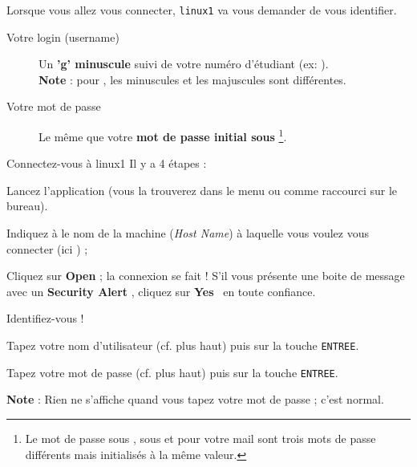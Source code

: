 \documentclass[a4paper,11pt]{style-esi/td}
\begin{document}
		\bigskip
		Lorsque vous allez vous connecter, \verb_linux1_ va vous demander de vous identifier.

		\begin{infobox}
			\begin{description}
			\item[Votre login (username)]
				Un \textbf{'g' minuscule} suivi de votre numéro d'étudiant
				(ex: ).
				\\\textbf{Note} : pour , les minuscules et les majuscules 
				sont différentes.
			\item[Votre mot de passe]
				Le même que votre \textbf{mot de passe initial sous }%
				\footnote{%
					Le mot de passe sous ,
					sous  et pour votre mail  
					sont trois mots de passe différents
					mais initialisés à la même valeur.        
				}.			
			\end{description}
		\end{infobox}

		\begin{Tutoriel}{Connectez-vous à linux1} 
		Il y a 4 étapes :
		\begin{steps}			
		\item 
			Lancez l'application  
			(vous la trouverez dans le menu ou comme raccourci sur le bureau).			
		\item 
			Indiquez à  le nom de la machine (\textit{Host Name}) 
			à laquelle vous voulez vous connecter (ici ) ;
		\item 
			Cliquez sur \og \textbf{Open} \fg ; 
			la connexion se fait ! 
			S'il vous présente une boite de message avec un \og \textbf{Security Alert} \fg, 
			cliquez sur \og \textbf{Yes} \fg\ en toute confiance.			
		\item 
			Identifiez-vous !
			\begin{steps}
			\item 
				Tapez votre nom d'utilisateur (cf. plus haut) 
				puis sur la touche \verb_ENTREE_. 
			\item 
				Tapez votre mot de passe (cf. plus haut) puis sur la touche \verb_ENTREE_.
				\par
				\textbf{Note} : Rien ne s'affiche quand vous tapez votre mot de passe ; c'est normal.
			\end{steps}
		\end{steps}
		\end{Tutoriel}

\newpage
\end{document}
